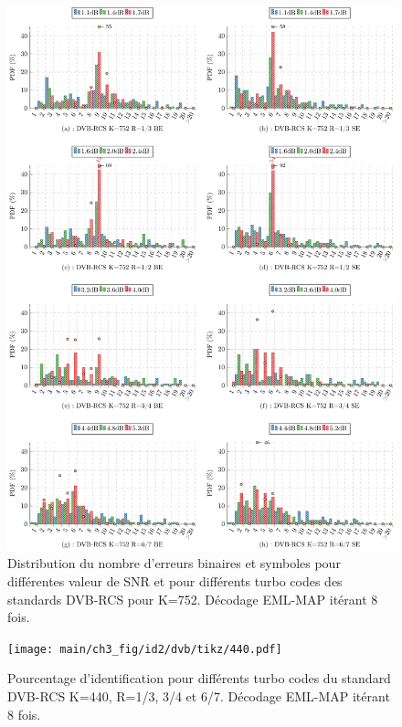 \begin{figure}[!ht] 
	\centering
	\hspace*{-1cm}
	\includegraphics[width=1.05\textwidth]{main/ch3_fig/be/dvb/tikz/be_752.pdf}
	\caption{Distribution du nombre d'erreurs binaires et symboles pour différentes valeur de SNR et pour différents turbo codes des 
	standards DVB-RCS pour K=752.	Décodage EML-MAP itérant 8 fois. \label{fig:be_dvb752}}
\end{figure}



\begin{figure}[!h]
	\centering
	\hspace*{-1cm}
	\texttt{[image: main/ch3\_fig/id2/dvb/tikz/440.pdf]}
	\caption{Pourcentage d'identification pour différents turbo codes du standard DVB-RCS K=440, R=1/3, 3/4 et 6/7.
	Décodage EML-MAP itérant 8 fois. \label{fig:dvb440}}
\end{figure}

